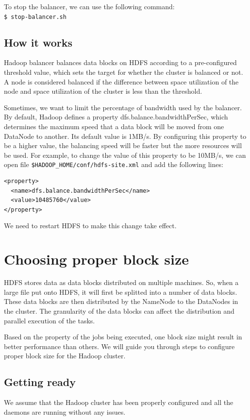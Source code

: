 To stop the balancer, we can use the following command:\\
\verb|$ stop-balancer.sh|

\subsection*{How it works}
Hadoop balancer balances data blocks on HDFS according to a pre-configured threshold value, which sets the target for whether the cluster is balanced or not. A node is considered balanced if the difference between space utilization of the node and space utilization of the cluster is less than the threshold.

Sometimes, we want to limit the percentage of bandwidth used by the balancer. By default, Hadoop defines a property dfs.balance.bandwidthPerSec, which determines the maximum speed that a data block will be moved from one DataNode to another. Its default value is 1MB/s. By configuring this property to be a higher value, the balancing speed will be faster but the more resources will be used. For example, to change the value of this property to be 10MB/s, we can open file \verb|$HADOOP_HOME/conf/hdfs-site.xml| and add the following lines:
\lstset{style=bashstyle}
\begin{lstlisting}
<property>
  <name>dfs.balance.bandwidthPerSec</name>
  <value>10485760</value>
</property>
\end{lstlisting}
\begin{info}We need to restart HDFS to make this change take effect.\end{info}

\section{Choosing proper block size}
HDFS stores data as data blocks distributed on multiple machines. So, when a large file put onto HDFS, it will first be splitted into a number of data blocks. These data blocks are then distributed by the NameNode to the DataNodes in the cluster. The granularity of the data blocks can affect the distribution and parallel execution of the tasks.

Based on the property of the jobs being executed, one block size might result in better performance than others. We will guide you through steps to configure proper block size for the Hadoop cluster.
\subsection*{Getting ready}
We assume that the Hadoop cluster has been properly configured and all the daemons are running without any issues.


